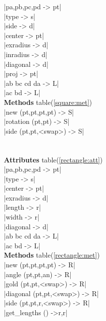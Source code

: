 \documentclass[DIV         = 14,
               fontsize    = 10,
               index       = totoc,
               twoside,
               cadre,
               headings    = small
               ]{tkz-doc}
\begin{document}
\begin{multicols}{3}
|pa,pb,pc,pd               -> pt|  \\
|type                      -> s|   \\
|side                      -> d|   \\
|center                    -> pt|  \\
|exradius                  -> d|   \\
|inradius                  -> d|   \\
|diagonal                  -> d| \\
|proj                      -> pt|  \\
|ab bc cd da               -> L|   \\
|ac bd                     -> L|   \\
 \textbf{Methods} table(\ref{square:met})      \\
|new (pt,pt,pt,pt)         -> S|   \\ 
|rotation (pt,pt)          -> S|   \\
|side (pt,pt,<swap>)       -> S|   \\
                                   \\
          \\
\textbf{Attributes} table(\ref{rectangle:att}) \\
|pa,pb,pc,pd               -> pt|  \\
|type                      -> s|   \\
|center                    -> pt|  \\
|exradius                  -> d|   \\
|length                    -> r|   \\
|width                     -> r|   \\
|diagonal                  -> d|   \\
|ab bc cd da               -> L|   \\
|ac bd                     -> L|   \\
 \textbf{Methods} table(\ref{rectangle:met}) \\
|new (pt,pt,pt,pt)         -> R|   \\ 
|angle (pt,pt,an)          -> R|   \\
|gold  (pt,pt,<swap>)      -> R|   \\
|diagonal  (pt,pt,<swap>)  -> R|   \\
|side  (pt,pt,r,<swap>)    -> R|   \\
|get_lengths ()            ->r,r|  \\

\end{multicols}
\end{document}

